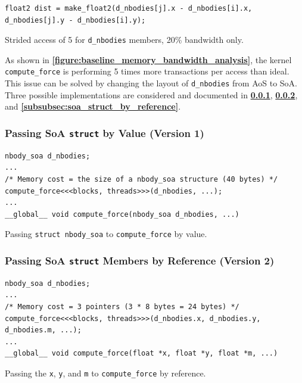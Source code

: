 \documentclass[12pt, a4paper]{article}
\let\oldcref\cref
\renewcommand{\cref}[1]{\textbf{\oldcref{#1}}}
\begin{document}
\begin{listing}[ht]
  \begin{verbatim}
float2 dist = make_float2(d_nbodies[j].x - d_nbodies[i].x, d_nbodies[j].y - d_nbodies[i].y);
  \end{verbatim}
  \caption{Strided access of 5 for \texttt{d\_nbodies} members, 20\% bandwidth only.}
\end{listing}

As shown in \cref{figure:baseline_memory_bandwidth_analysis}, the kernel \texttt{compute\_force} is
performing 5 times more transactions per access than ideal. This issue can be solved by changing the
layout of \texttt{d\_nbodies} from AoS to SoA. Three possible implementations are considered and
documented in \cref{subsubsec:soa_struct_by_value}, \cref{subsubsec:soa_struct_member}, and
\cref{subsubsec:soa_struct_by_reference}.

\subsubsection{Passing SoA \texorpdfstring{\texttt{struct}}{} by Value (Version 1)} \label{subsubsec:soa_struct_by_value}
\begin{listing}[H]
  \begin{verbatim}
nbody_soa d_nbodies;
...
/* Memory cost = the size of a nbody_soa structure (40 bytes) */
compute_force<<<blocks, threads>>>(d_nbodies, ...);
...
__global__ void compute_force(nbody_soa d_nbodies, ...)
  \end{verbatim}
  \caption{Passing \texttt{struct nbody_soa} to \texttt{compute\_force} by value.}
\end{listing}

\subsubsection{Passing SoA \texorpdfstring{\texttt{struct}}{} Members by Reference (Version 2)} \label{subsubsec:soa_struct_member}
\begin{listing}[H]
  \begin{verbatim}
nbody_soa d_nbodies;
...
/* Memory cost = 3 pointers (3 * 8 bytes = 24 bytes) */
compute_force<<<blocks, threads>>>(d_nbodies.x, d_nbodies.y,  d_nbodies.m, ...);
...
__global__ void compute_force(float *x, float *y, float *m, ...)
  \end{verbatim}
  \caption{Passing the \texttt{x}, \texttt{y}, and \texttt{m} to \texttt{compute\_force} by reference.}
\end{listing}
\end{document}
